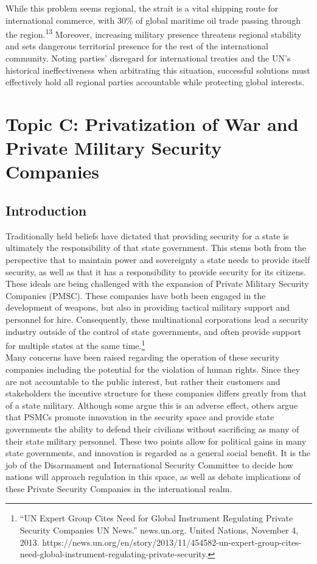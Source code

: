 \documentclass[10pt, letterpaper]{article}
\begin{document}
While this problem seems regional, the strait is a vital shipping route
for international commerce, with 30\% of global maritime oil trade
passing through the region.\textsuperscript{13} Moreover, increasing
military presence threatens regional stability and sets dangerous
territorial presence for the rest of the international community. Noting
parties' disregard for international treaties and the UN's historical
ineffectiveness when arbitrating this situation, successful solutions
must effectively hold all regional parties accountable while protecting
global interests.

\newpage
\section{Topic C: Privatization of War and Private Military Security
Companies}

\subsection{Introduction}

Traditionally held beliefs have dictated that providing security for a
state is ultimately the responsibility of that state government. This
stems both from the perspective that to maintain power and sovereignty a
state needs to provide itself security, as well as that it has a
responsibility to provide security for its citizens. These ideals are
being challenged with the expansion of Private Military Security
Companies (PMSC). These companies have both been engaged in the
development of weapons, but also in providing tactical military support
and personnel for hire. Consequently, these multinational corporations
lead a security industry outside of the control of state governments,
and often provide support for multiple states at the same
time.\footnote{``UN Expert Group Cites Need for Global Instrument
  Regulating Private Security Companies \textbar{} \textbar{} UN News.''
  news.un.org. United Nations, November 4, 2013.
  https://news.un.org/en/story/2013/11/454582-un-expert-group-cites-need-global-instrument-regulating-private-security.} \\

Many concerns have been raised regarding the operation of these security
companies including the potential for the violation of human rights.
Since they are not accountable to the public interest, but rather their
customers and stakeholders the incentive structure for these companies
differs greatly from that of a state military. Although some argue this
is an adverse effect, others argue that PSMCs promote innovation in the
security space and provide state governments the ability to defend their
civilians without sacrificing as many of their state military personnel.
These two points allow for political gains in many state governments,
and innovation is regarded as a general social benefit. It is the job of
the Disarmament and International Security Committee to decide how
nations will approach regulation in this space, as well as debate
implications of these Private Security Companies in the international
realm. \\
\end{document}
